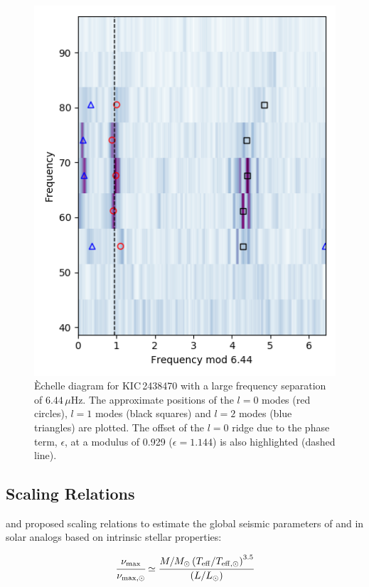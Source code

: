 \begin{figure}
    \centering
    \includegraphics[height=0.5\textheight]{Chapter5/echelle_2438470_somemodes.png}
    \caption[Typical \'echelle diagram for a Red Giant solar-like oscillator]{\`Echelle diagram for KIC\,2438470 with a large frequency separation of $6.44\,\mu\mathrm{Hz}$. The approximate positions of the $l = 0$ modes (red circles), $l = 1$ modes (black squares) and $l = 2$ modes (blue triangles) are plotted. The offset of the $l=0$ ridge due to the phase term, $\epsilon$, at a modulus of 0.929 ($\epsilon = 1.144$) is also highlighted (dashed line). }
    \label{fig:echelle}
\end{figure}

\subsection*{Scaling Relations}

\cite{brown_detection_1991} and \cite{kjeldsen_amplitudes_1995} proposed scaling relations to estimate the global seismic parameters of \numax{} and \dnu{} in solar analogs based on intrinsic stellar properties:

\begin{equation}
    \cfrac{\nu_{\mathrm{max}}}{\nu_{\mathrm{max},\odot}} \simeq \cfrac{M/M_{\odot}\left(T_{\mathrm{eff}}/T_{\mathrm{eff},\odot}\right)^{3.5}}{(L/L_{\odot})}
    \label{eqtn:numax_scaling}
\end{equation}


